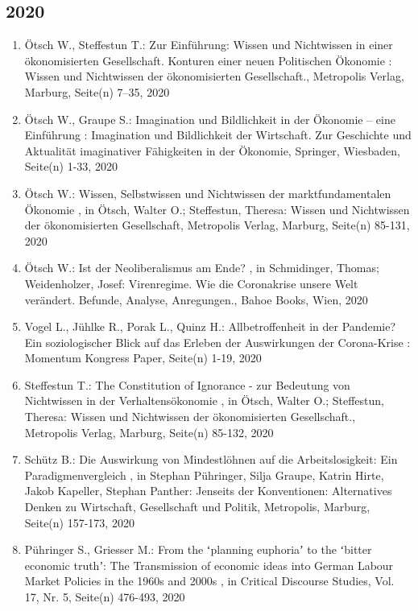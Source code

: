  \subsection*{2020} 
 \begin{enumerate}[leftmargin=*, labelsep=0.5cm] 
	 \item Ötsch W., Steffestun T.:  Zur Einführung: Wissen und Nichtwissen in einer ökonomisierten Gesellschaft. Konturen einer neuen Politischen Ökonomie  : Wissen und Nichtwissen der ökonomisierten Gesellschaft., Metropolis Verlag, Marburg, Seite(n) 7–35, 2020
	 \item Ötsch W., Graupe S.:  Imagination und Bildlichkeit in der Ökonomie – eine Einführung  : Imagination und Bildlichkeit der Wirtschaft. Zur Geschichte und Aktualität imaginativer Fähigkeiten in der Ökonomie, Springer, Wiesbaden, Seite(n) 1-33, 2020
	 \item Ötsch W.:  Wissen, Selbstwissen und Nichtwissen der marktfundamentalen Ökonomie  , in Ötsch, Walter O.; Steffestun, Theresa: Wissen und Nichtwissen der ökonomisierten Gesellschaft, Metropolis Verlag, Marburg, Seite(n) 85-131, 2020
	 \item Ötsch W.:  Ist der Neoliberalismus am Ende?  , in Schmidinger, Thomas; Weidenholzer, Josef: Virenregime. Wie die Coronakrise unsere Welt verändert. Befunde, Analyse, Anregungen., Bahoe Books, Wien, 2020
	 \item Vogel L., Jühlke R., Porak L., Quinz H.:  Allbetroffenheit in der Pandemie? Ein soziologischer Blick auf das Erleben der Auswirkungen der Corona-Krise  : Momentum Kongress Paper, Seite(n) 1-19, 2020
	 \item Steffestun T.:  The Constitution of Ignorance - zur Bedeutung von Nichtwissen in der Verhaltensökonomie  , in Ötsch, Walter O.; Steffestun, Theresa: Wissen und Nichtwissen der ökonomisierten Gesellschaft., Metropolis Verlag, Marburg, Seite(n) 85-132, 2020
	 \item Schütz B.:  Die Auswirkung von Mindestlöhnen auf die Arbeitslosigkeit: Ein Paradigmenvergleich  , in Stephan Pühringer, Silja Graupe, Katrin Hirte, Jakob Kapeller, Stephan Panther: Jenseits der Konventionen: Alternatives Denken zu Wirtschaft, Gesellschaft und Politik, Metropolis, Marburg, Seite(n) 157-173, 2020
	 \item Pühringer S., Griesser M.:  From the ʻplanning euphoriaʼ to the ʻbitter economic truthʼ: The Transmission of economic ideas into German Labour Market Policies in the 1960s and 2000s  , in Critical Discourse Studies, Vol. 17, Nr. 5, Seite(n) 476-493, 2020

\end{enumerate}
